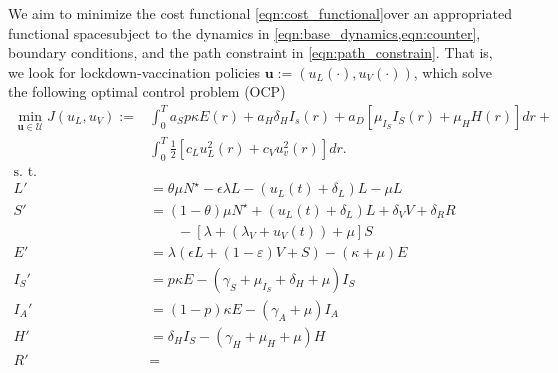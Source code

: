     We aim to minimize the cost functional
\eqref{eqn:cost_functional}\textemdash over an appropriated functional
space\textemdash subject to the dynamics in
\cref{eqn:base_dynamics,eqn:counter}, boundary conditions, and the path
constraint in \eqref{eqn:path_constrain}.
That is, we look for lockdown-vaccination policies 
$\mathbf{u}:=(u_L(\cdot), u_V(\cdot))$, which solve the following optimal
control problem (OCP)
\begin{equation}
    \label{eqn:lockdown_vaccination_ocp}
    \begin{aligned}
        \min_{\mathbf{u} \in \mathcal{U}}
            J(u_L, u_V) := &
                \int_0 ^  T
                    a_S p \kappa E(r) +
                    a_H \delta_H I_s(r) +
                    a_D
                    \left[
                        \mu_{I_S} I_S(r) + \mu_H H(r)
                    \right]
                dr +
        \\
                &
                \int_0^T
                    \frac{1}{2}
                    \left[
                        c_L u_L^2(r) +
                        c_V u_v^2(r)
                    \right]
                    dr.
        \\
            \text{s. t.} &
        \\
            L' & =  \theta \mu N^{\star}
                -\epsilon \lambda L - (u_L(t) + \delta_L) L - \mu L
        \\
            S' & =
                (1 - \theta) \mu N^\star
                + (u_L(t) + \delta_L) L
                + \delta_V V
                + \delta_R R
        \\
                & \qquad -
                \left[
                \lambda + (\lambda_V + u_V(t)) + \mu
                \right] S
        \\
            E' &=
                \lambda (\epsilon L + (1-\varepsilon) V + S)
                - (\kappa + \mu) E
        \\
            I_S' &=
                p \kappa E
                - (\gamma_S +
                    \mu_{I_S} +
                    \delta_H +
                    \mu) I_S
        \\
            I_A' &=
                (1 - p) \kappa E - (\gamma_A + \mu) I_A
        \\
            H' &=
                \delta_H I_S - (\gamma_H + \mu_H + \mu) H
        \\
            R'  &=

\end{aligned}
\end{equation}
